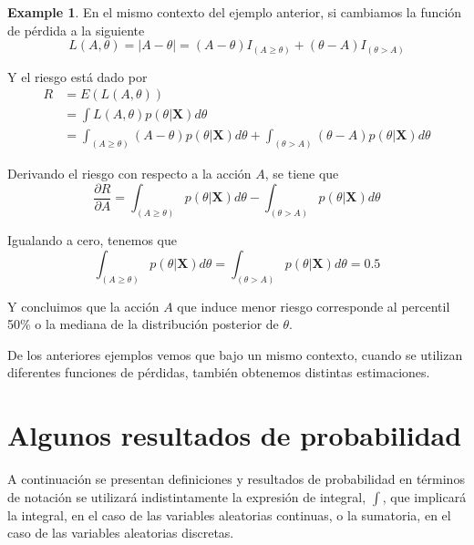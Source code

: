 \documentclass[
  spanish,
  letter]{book}
\theoremstyle{definition}
\theoremstyle{definition}
\newtheorem{example}{Example}[chapter]
\theoremstyle{definition}
\theoremstyle{remark}
\begin{document}
\begin{example}
\protect\hypertarget{exm:unnamed-chunk-3}{}{\label{exm:unnamed-chunk-3} }En el mismo contexto del ejemplo anterior, si cambiamos la función de pérdida a la siguiente
\begin{equation*}
L(A,\theta)=|A-\theta|=(A-\theta)I_{(A\geq\theta)}+(\theta-A)I_{(\theta>A)}
\end{equation*}

Y el riesgo está dado por
\begin{align*}
R&=E(L(A,\theta))\\
&=\int L(A,\theta)p(\theta|\mathbf{X})d\theta\\
&=\int_{(A\geq\theta)}(A-\theta)p(\theta|\mathbf{X})d\theta+\int_{(\theta>A)}(\theta-A)p(\theta|\mathbf{X})d\theta
\end{align*}

Derivando el riesgo con respecto a la acción \(A\), se tiene que
\begin{equation*}
\frac{\partial R}{\partial A}=\int_{(A\geq\theta)}p(\theta|\mathbf{X})d\theta-\int_{(\theta>A)}p(\theta|\mathbf{X})d\theta
\end{equation*}

Igualando a cero, tenemos que
\begin{equation*}
\int_{(A\geq\theta)}p(\theta|\mathbf{X})d\theta=\int_{(\theta>A)}p(\theta|\mathbf{X})d\theta=0.5
\end{equation*}

Y concluimos que la acción \(A\) que induce menor riesgo corresponde al percentil 50\% o la mediana de la distribución posterior de \(\theta\).
\end{example}

De los anteriores ejemplos vemos que bajo un mismo contexto, cuando se utilizan diferentes funciones de pérdidas, también obtenemos distintas estimaciones.

\hypertarget{algunos-resultados-de-probabilidad}{%
\chapter{Algunos resultados de probabilidad}\label{algunos-resultados-de-probabilidad}}

A continuación se presentan definiciones y resultados de probabilidad en términos de notación se utilizará indistintamente la expresión de integral, \(\int\), que implicará la integral, en el caso de las variables aleatorias continuas, o la sumatoria, en el caso de las variables aleatorias discretas.
\end{document}
